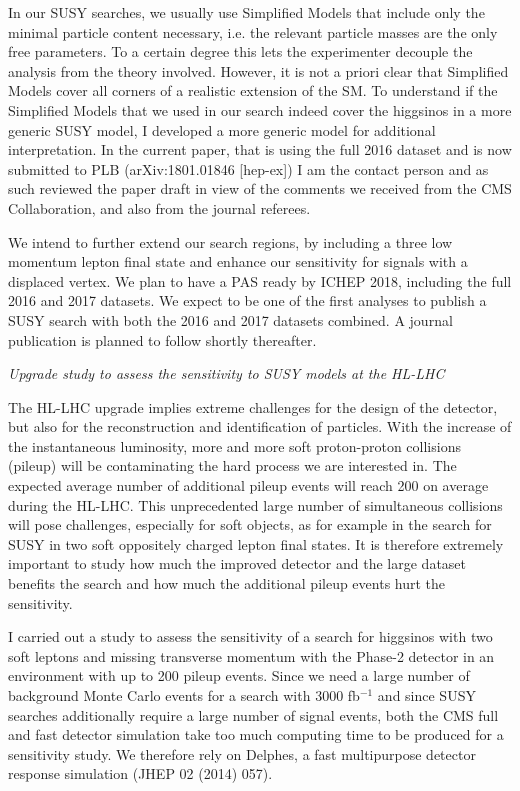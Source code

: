 \documentclass[]{cv} %
\begin{document}
\begin{statement}
In our SUSY searches, we usually use Simplified Models that include only the
minimal particle content necessary, i.e. the relevant particle masses are the
only free parameters. To a certain degree this lets the experimenter decouple
the analysis from the theory involved. However, it is not a priori clear that
Simplified Models cover all corners of a realistic extension of the SM. To
understand if the Simplified Models that we used in our search indeed cover the
higgsinos in a more generic SUSY model, I developed a more generic model for
additional interpretation. In the current paper, that is using the full 2016
dataset and is now submitted to PLB (arXiv:1801.01846 [hep-ex]) I am the contact
person and as such reviewed the paper draft in view of the comments we received
from the CMS Collaboration, and also from the journal referees.  

We intend to further extend our search regions, by including a three low
momentum lepton final state and enhance our sensitivity for signals with a
displaced vertex. We plan to have a PAS ready by ICHEP 2018, including the full
2016 and 2017 datasets. We expect to be one of the first analyses to publish a
SUSY search with both the 2016 and 2017 datasets combined. A journal publication
is planned to follow shortly thereafter.

\vspace{15pt}
\Large{}
\textit{Upgrade study to assess the sensitivity to SUSY models at the HL-LHC}
\normalsize{}

The HL-LHC upgrade implies extreme challenges for the design of the detector,
but also for the reconstruction and identification of particles. With the
increase of the instantaneous luminosity, more and more soft proton-proton
collisions (pileup) will be contaminating the hard process we are interested in.
The expected average number of additional pileup events will reach 200 on
average during the HL-LHC. This unprecedented large number of simultaneous
collisions will pose challenges, especially for soft objects, as for example in
the search for SUSY in two soft oppositely charged lepton final states. It is
therefore extremely important to study how much the improved detector and the
large dataset benefits the search and how much the additional pileup events hurt
the sensitivity.

I carried out a study to assess the sensitivity of a search for higgsinos with
two soft leptons and missing transverse momentum with the Phase-2 detector in an
environment with up to 200 pileup events. Since we need a large number of
background Monte Carlo events for a search with 3000 fb$^{-1}$ and since SUSY
searches additionally require a large number of signal events, both the CMS full
and fast detector simulation take too much computing time to be produced for a
sensitivity study. We therefore rely on Delphes, a fast multipurpose detector
response simulation (JHEP 02 (2014) 057).


\end{statement}
\end{document}
